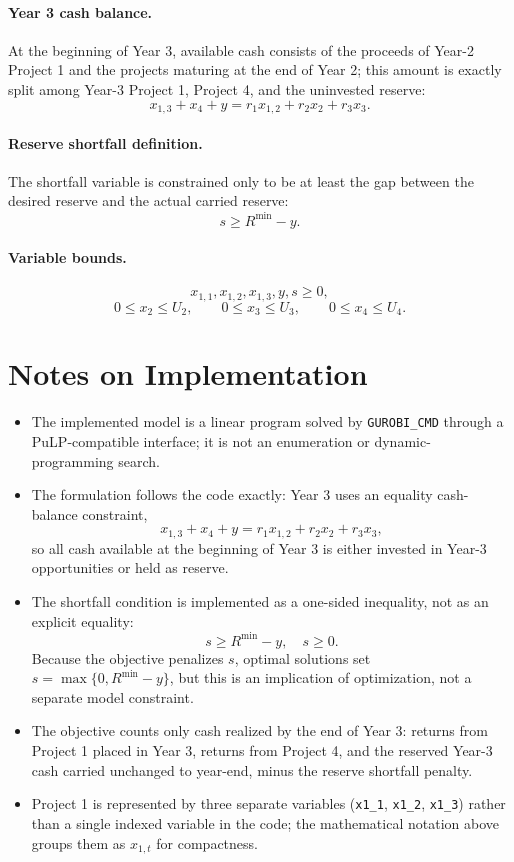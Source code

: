 \paragraph{Year 3 cash balance.}
At the beginning of Year 3, available cash consists of the proceeds of Year-2 Project 1 and the projects maturing at the end of Year 2; this amount is exactly split among Year-3 Project 1, Project 4, and the uninvested reserve:
\[
x_{1,3} + x_4 + y = r_1 x_{1,2} + r_2 x_2 + r_3 x_3.
\]

\paragraph{Reserve shortfall definition.}
The shortfall variable is constrained only to be at least the gap between the desired reserve and the actual carried reserve:
\[
s \ge R^{\min} - y.
\]

\paragraph{Variable bounds.}
\[
x_{1,1},x_{1,2},x_{1,3},y,s \ge 0,
\]
\[
0 \le x_2 \le U_2,\qquad 0 \le x_3 \le U_3,\qquad 0 \le x_4 \le U_4.
\]

\section*{Notes on Implementation}

\begin{itemize}
    \item The implemented model is a linear program solved by \texttt{GUROBI\_CMD} through a PuLP-compatible interface; it is not an enumeration or dynamic-programming search.
    \item The formulation follows the code exactly: Year 3 uses an equality cash-balance constraint,
    \[
    x_{1,3}+x_4+y = r_1x_{1,2}+r_2x_2+r_3x_3,
    \]
    so all cash available at the beginning of Year 3 is either invested in Year-3 opportunities or held as reserve.
    \item The shortfall condition is implemented as a one-sided inequality, not as an explicit equality:
    \[
    s \ge R^{\min}-y,\quad s\ge 0.
    \]
    Because the objective penalizes $s$, optimal solutions set $s=\max\{0,R^{\min}-y\}$, but this is an implication of optimization, not a separate model constraint.
    \item The objective counts only cash realized by the end of Year 3: returns from Project 1 placed in Year 3, returns from Project 4, and the reserved Year-3 cash carried unchanged to year-end, minus the reserve shortfall penalty.
    \item Project 1 is represented by three separate variables (\texttt{x1\_1}, \texttt{x1\_2}, \texttt{x1\_3}) rather than a single indexed variable in the code; the mathematical notation above groups them as $x_{1,t}$ for compactness.
\end{itemize}
